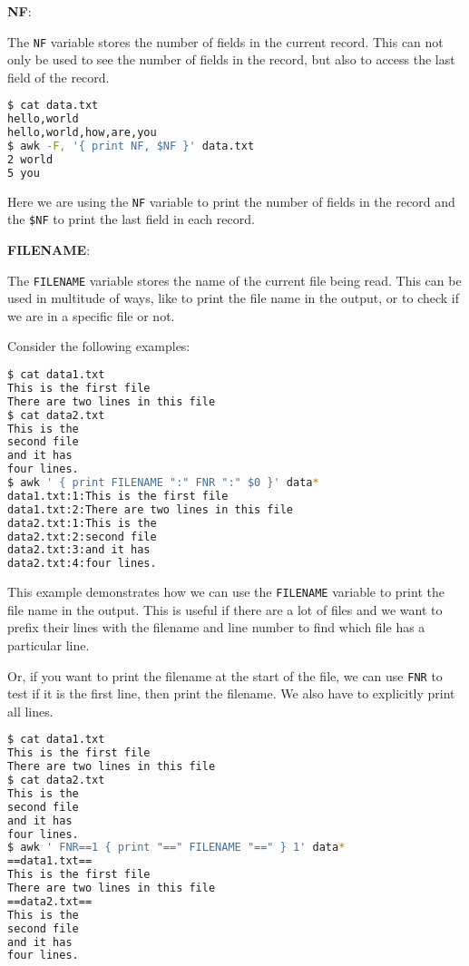 \textbf{NF}:

The \lstinline|NF| variable stores the number of fields in the current record.
This can not only be used to see the number of fields in the record, but also to access the last field of the record.

\begin{lstlisting}[language=bash]
$ cat data.txt
hello,world
hello,world,how,are,you
$ awk -F, '{ print NF, $NF }' data.txt
2 world
5 you
\end{lstlisting}

Here we are using the \lstinline|NF| variable to print the number of fields in the record and the \lstinline|$NF| to print the last field in each record.

\textbf{FILENAME}:

The \lstinline|FILENAME| variable stores the name of the current file being read.
This can be used in multitude of ways, like to print the file name in the output, or to check if we are in a specific file or not.

Consider the following examples:

\begin{lstlisting}[language=bash]
$ cat data1.txt
This is the first file
There are two lines in this file
$ cat data2.txt
This is the
second file
and it has
four lines.
$ awk ' { print FILENAME ":" FNR ":" $0 }' data*
data1.txt:1:This is the first file
data1.txt:2:There are two lines in this file
data2.txt:1:This is the
data2.txt:2:second file
data2.txt:3:and it has
data2.txt:4:four lines.
\end{lstlisting}

This example demonstrates how we can use the \lstinline|FILENAME| variable to print the file name in the output.
This is useful if there are a lot of files and we want to prefix their lines with the filename and line number to find which file has a particular line.

Or, if you want to print the filename at the start of the file, we can use \lstinline|FNR| to test if it is the first line, then print the filename. We also have to explicitly print all lines.

\begin{lstlisting}[language=bash]
$ cat data1.txt
This is the first file
There are two lines in this file
$ cat data2.txt
This is the
second file
and it has
four lines.
$ awk ' FNR==1 { print "==" FILENAME "==" } 1' data*
==data1.txt==
This is the first file
There are two lines in this file
==data2.txt==
This is the
second file
and it has
four lines.
\end{lstlisting}

